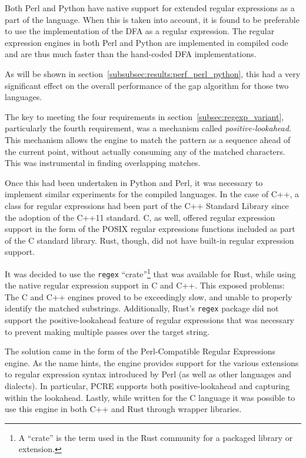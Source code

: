Both Perl and Python have native support for extended regular expressions as a part of the language. When this is taken into account, it is found to be preferable to use the implementation of the DFA as a regular expression. The regular expression engines in both Perl and Python are implemented in compiled code and are thus much faster than the hand-coded DFA implementations.

As will be shown in section~\ref{subsubsec:results:perf_perl_python}, this had a very significant effect on the overall performance of the gap algorithm for those two languages.

The key to meeting the four requirements in section~\ref{subsec:regexp_variant}, particularly the fourth requirement, was a mechanism called \textit{positive-lookahead}. This mechanism allows the engine to match the pattern as a sequence ahead of the current point, without actually consuming any of the matched characters. This was instrumental in finding overlapping matches.

Once this had been undertaken in Python and Perl, it was necessary to implement similar experiments for the compiled languages. In the case of C++, a class for regular expressions had been part of the C++ Standard Library since the adoption of the C++11 standard. C, as well, offered regular expression support in the form of the POSIX regular expressions functions included as part of the C standard library. Rust, though, did not have built-in regular expression support.

It was decided to use the \texttt{regex} ``crate''\footnote{A ``crate'' is the term used in the Rust community for a packaged library or extension.} that was available for Rust, while using the native regular expression support in C and C++. This exposed problems: The C and C++ engines proved to be exceedingly slow, and unable to properly identify the matched substrings. Additionally, Rust's \texttt{regex} package did not support the positive-lookahead feature of regular expressions that was necessary to prevent making multiple passes over the target string.

The solution came in the form of the Perl-Compatible Regular Expressions engine. As the name hints, the engine provides support for the various extensions to regular expression syntax introduced by Perl (as well as other languages and dialects). In particular, PCRE supports both positive-lookahead and capturing within the lookahead. Lastly, while written for the C language it was possible to use this engine in both C++ and Rust through wrapper libraries.

